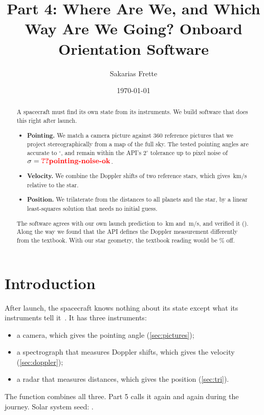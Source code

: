 \documentclass[aps,prd,twocolumn,nofootinbib,floatfix,superscriptaddress]{revtex4-2}
\begin{document}
\title{Part 4: Where Are We, and Which Way Are We Going? Onboard Orientation Software}
\author{Sakarias Frette}
\date{\today}

\begin{abstract}
A spacecraft must find its own state from its instruments.
We build software that does this right after launch.
\begin{itemize}
\item \textbf{Pointing.} We match a camera picture against 360 reference pictures that we project stereographically from a map of the full sky. The tested pointing angles are accurate to $^\circ$, and remain within the API's $2^\circ$ tolerance up to pixel noise of $\sigma=\val{pointing-noise-ok}$.
\item \textbf{Velocity.} We combine the Doppler shifts of two reference stars, which gives \,km/s relative to the star.
\item \textbf{Position.} We trilaterate from the distances to all planets and the star, by a linear least-squares solution that needs no initial guess.
\end{itemize}
The software agrees with our own launch prediction to \,km and \,m/s, and  verified it ().
Along the way we found that the API defines the Doppler measurement differently from the textbook.
With our star geometry, the textbook reading would be \% off.
\end{abstract}

\maketitle

\section{Introduction}
After launch, the spacecraft knows nothing about its state except what its instruments tell it~\cite{ast2000project}.
It has three instruments:
\begin{itemize}
\item a camera, which gives the pointing angle (\cref{sec:pictures});
\item a spectrograph that measures Doppler shifts, which gives the velocity (\cref{sec:doppler});
\item a radar that measures distances, which gives the position (\cref{sec:tri}).
\end{itemize}
The function  combines all three.
Part 5 calls it again and again during the journey.
Solar system seed: .
\end{document}
